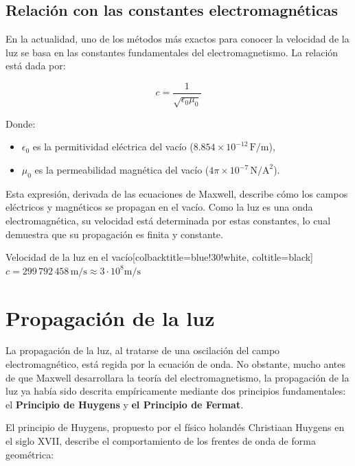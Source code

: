 \subsection*{Relación con las constantes electromagnéticas}

En la actualidad, uno de los métodos más exactos para conocer la velocidad de la luz se basa en las constantes fundamentales del electromagnetismo. La relación está dada por:

\[
c = \frac{1}{\sqrt{\epsilon_0 \mu_0}}
\]

Donde:
\begin{itemize}
	\item $\epsilon_0$ es la permitividad eléctrica del vacío ($8.854 \times 10^{-12}\, \text{F/m}$),
	\item $\mu_0$ es la permeabilidad magnética del vacío ($4\pi \times 10^{-7}\, \text{N/A}^2$).
\end{itemize}

Esta expresión, derivada de las ecuaciones de Maxwell, describe cómo los campos eléctricos y magnéticos se propagan en el vacío. Como la luz es una onda electromagnética, su velocidad está determinada por estas constantes, lo cual demuestra que su propagación es finita y constante.

\begin{mybox}[blue]{Velocidad de la luz en el vacío}[colbacktitle=blue!30!white, coltitle=black]
	$c = 299\,792\,458 \, \text{m/s} \approx 3\cdot10^8 \text{m/s}$ 
\end{mybox}

\vspace{0.3cm}


\section*{Propagación de la luz}

La propagación de la luz, al tratarse de una oscilación del campo electromagnético, está regida por la ecuación de onda. No obstante, mucho antes de que Maxwell desarrollara la teoría del electromagnetismo, la propagación de la luz ya había sido descrita empíricamente mediante dos principios fundamentales: el \textbf{Principio de Huygens} y \textbf{el Principio de Fermat}.

El principio de Huygens, propuesto por el físico holandés Christiaan Huygens en el siglo XVII, describe el comportamiento de los frentes de onda de forma geométrica:

